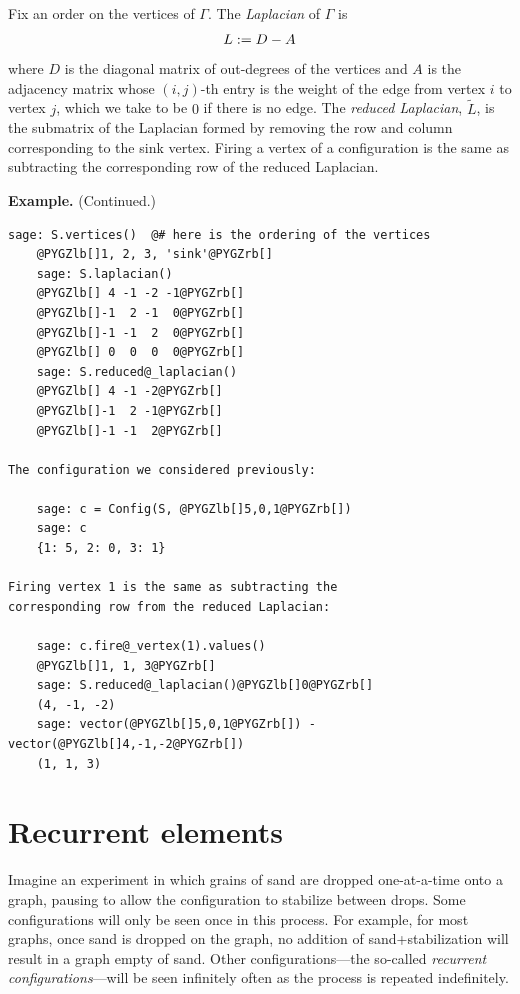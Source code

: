 \documentclass[letterpaper,10pt,english]{manual}
\begin{document}
Fix an order on the vertices of $\Gamma$. The \emph{Laplacian} of $\Gamma$ is
\begin{gather}
\begin{split}L := D-A\end{split}\notag
\end{gather}
where $D$ is the diagonal matrix of out-degrees of the vertices and $A$ is the
adjacency matrix whose $(i,j)$-th entry is the weight of the edge from vertex
$i$ to vertex $j$, which we take to be $0$ if there is no edge.  The \emph{reduced
Laplacian}, $\tilde{L}$, is the submatrix of the Laplacian formed by removing
the row and column corresponding to the sink vertex.  Firing a vertex of a
configuration is the same as subtracting the corresponding row of the reduced
Laplacian.

\textbf{Example.} (Continued.)

\begin{Verbatim}[commandchars=@\[\]]
    sage: S.vertices()  @# here is the ordering of the vertices
    @PYGZlb[]1, 2, 3, 'sink'@PYGZrb[]
    sage: S.laplacian()
    @PYGZlb[] 4 -1 -2 -1@PYGZrb[]
    @PYGZlb[]-1  2 -1  0@PYGZrb[]
    @PYGZlb[]-1 -1  2  0@PYGZrb[]
    @PYGZlb[] 0  0  0  0@PYGZrb[]
    sage: S.reduced@_laplacian()
    @PYGZlb[] 4 -1 -2@PYGZrb[]
    @PYGZlb[]-1  2 -1@PYGZrb[]
    @PYGZlb[]-1 -1  2@PYGZrb[]

The configuration we considered previously:

    sage: c = Config(S, @PYGZlb[]5,0,1@PYGZrb[])
    sage: c
    {1: 5, 2: 0, 3: 1}

Firing vertex 1 is the same as subtracting the
corresponding row from the reduced Laplacian:

    sage: c.fire@_vertex(1).values()
    @PYGZlb[]1, 1, 3@PYGZrb[]
    sage: S.reduced@_laplacian()@PYGZlb[]0@PYGZrb[]
    (4, -1, -2)
    sage: vector(@PYGZlb[]5,0,1@PYGZrb[]) - vector(@PYGZlb[]4,-1,-2@PYGZrb[])
    (1, 1, 3)
\end{Verbatim}


\section{Recurrent elements}

Imagine an experiment in which grains of sand are dropped one-at-a-time onto a
graph, pausing to allow the configuration to stabilize between drops.  Some
configurations will only be seen once in this process.  For example, for most
graphs, once sand is dropped on the graph, no addition of sand+stabilization
will result in a graph empty of sand.  Other configurations---the so-called
\emph{recurrent configurations}---will be seen infinitely often as the process is
repeated indefinitely.
\end{document}
